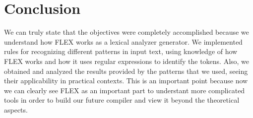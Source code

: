 \documentclass[a4paper,11pt]{scrarticle}
\begin{document}
    \section{Conclusion}
    We can truly state that the objectives were completely accomplished because we understand how FLEX works as a lexical analyzer generator. We implemented rules for recognizing different patterns in input text, using knowledge of how FLEX works and how it uses regular expressions to identify the tokens.
    Also, we obtained and analyzed the results provided by the patterns that we used, seeing their applicability in practical contexts. This is an important point because now we can clearly see FLEX as an important part to understant more complicated tools in order to build our future compiler and view it beyond the theoretical aspects.
    \nocite{*}
    \printbibliography
    
\end{document}
